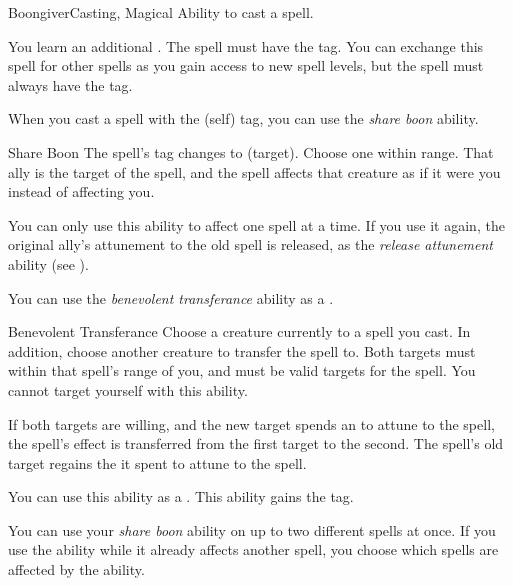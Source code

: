     \begin{feat}{Boongiver}{Casting, Magical}
        \featpre Ability to cast a spell.

         You learn an additional .
        The spell must have the  tag.
        You can exchange this spell for other spells as you gain access to new spell levels, but the spell must always have the  tag.

         When you cast a spell with the  (self) tag, you can use the \textit{share boon} ability.
        \begin{freeability}{Share Boon}
            The spell's  tag changes to  (target).
            Choose one  within \rngmed range.
            That ally is the target of the spell, and the spell affects that creature as if it were you instead of affecting you.

            You can only use this ability to affect one spell at a time.
            If you use it again, the original ally's attunement to the old spell is released, as the \textit{release attunement} ability (see ).
        \end{freeability}

         You can use the \textit{benevolent transferance} ability as a .
        \begin{freeability}{Benevolent Transferance}
            Choose a creature currently  to a spell you cast.
            In addition, choose another creature to transfer the spell to.
            Both targets must within that spell's range of you, and must be valid targets for the spell.
            You cannot target yourself with this ability.

            If both targets are willing, and the new target spends an  to attune to the spell, the spell's effect is transferred from the first target to the second.
            The spell's old target regains the  it spent to attune to the spell.

            \rankline
             You can use this ability as a .
             This ability gains the  tag.
        \end{freeability}

         You can use your \textit{share boon} ability on up to two different spells at once.
        If you use the ability while it already affects another spell, you choose which spells are affected by the ability.


\end{feat}
